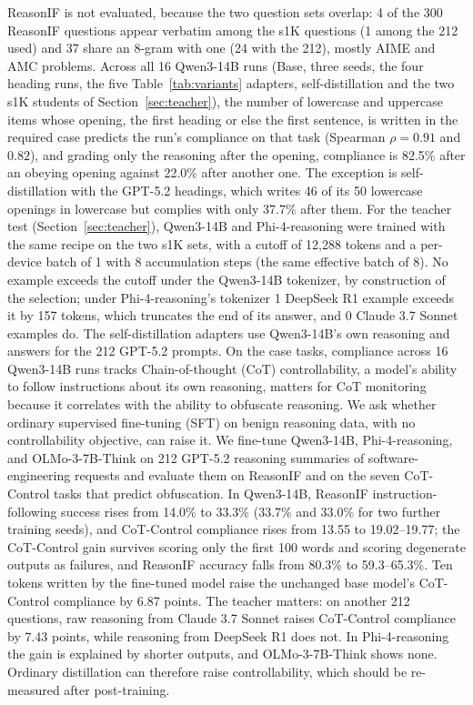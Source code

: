 ReasonIF is not evaluated, because the two question sets overlap: 4 of the 300 ReasonIF questions appear verbatim among the s1K questions (1 among the 212 used) and 37 share an 8-gram with one (24 with the 212), mostly AIME and AMC problems.
Across all 16 Qwen3-14B runs (Base, three seeds, the four heading runs, the five Table~\ref{tab:variants} adapters, self-distillation and the two s1K students of Section~\ref{sec:teacher}), the number of lowercase and uppercase items whose opening, the first heading or else the first sentence, is written in the required case predicts the run's compliance on that task (Spearman $\rho = 0.91$ and $0.82$), and grading only the reasoning after the opening, compliance is 82.5\% after an obeying opening against 22.0\% after another one. The exception is self-distillation with the GPT-5.2 headings, which writes 46 of its 50 lowercase openings in lowercase but complies with only 37.7\% after them.
 For the teacher test (Section~\ref{sec:teacher}), Qwen3-14B and Phi-4-reasoning were trained with the same recipe on the two s1K sets, with a cutoff of 12,288 tokens and a per-device batch of 1 with 8 accumulation steps (the same effective batch of 8). No example exceeds the cutoff under the Qwen3-14B tokenizer, by construction of the selection; under Phi-4-reasoning's tokenizer 1 DeepSeek R1 example exceeds it by 157 tokens, which truncates the end of its answer, and 0 Claude 3.7 Sonnet examples do. The self-distillation adapters use Qwen3-14B's own reasoning and answers for the 212 GPT-5.2 prompts.
On the case tasks, compliance across 16 Qwen3-14B runs tracks
Chain-of-thought (CoT) controllability, a model's ability to follow instructions about its own reasoning, matters for CoT monitoring because it correlates with the ability to obfuscate reasoning. We ask whether ordinary supervised fine-tuning (SFT) on benign reasoning data, with no controllability objective, can raise it. We fine-tune Qwen3-14B, Phi-4-reasoning, and OLMo-3-7B-Think on 212 GPT-5.2 reasoning summaries of software-engineering requests and evaluate them on ReasonIF and on the seven CoT-Control tasks that predict obfuscation. In Qwen3-14B, ReasonIF instruction-following success rises from 14.0\% to 33.3\% (33.7\% and 33.0\% for two further training seeds), and CoT-Control compliance rises from 13.55 to 19.02--19.77; the CoT-Control gain survives scoring only the first 100 words and scoring degenerate outputs as failures, and ReasonIF accuracy falls from 80.3\% to 59.3--65.3\%. Ten tokens written by the fine-tuned model raise the unchanged base model's CoT-Control compliance by 6.87 points. The teacher matters: on another 212 questions, raw reasoning from Claude 3.7 Sonnet raises CoT-Control compliance by 7.43 points, while reasoning from DeepSeek R1 does not. In Phi-4-reasoning the gain is explained by shorter outputs, and OLMo-3-7B-Think shows none. Ordinary distillation can therefore raise controllability, which should be re-measured after post-training.
